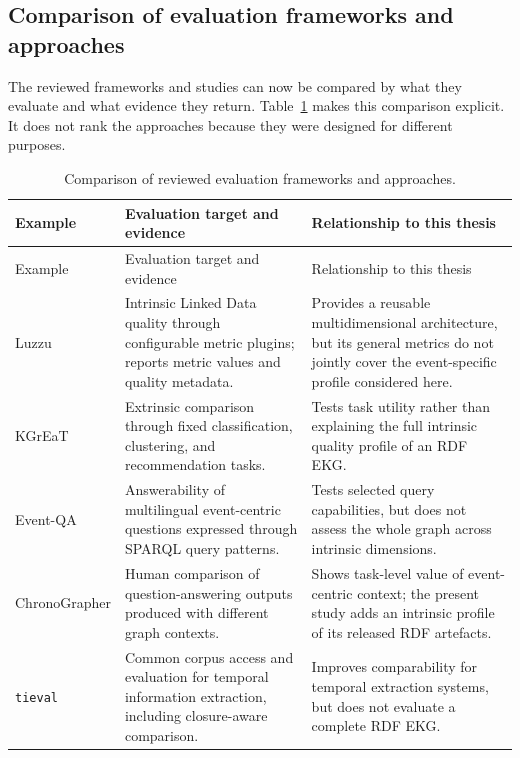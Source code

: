 \subsection{Comparison of evaluation frameworks and approaches}

The reviewed frameworks and studies can now be compared by what they evaluate and what evidence they return. Table~\ref{tab:reviewed-evaluation-comparison} makes this comparison explicit. It does not rank the approaches because they were designed for different purposes.

\begin{longtable}{>{\raggedright\arraybackslash}p{3.0cm}>{\raggedright\arraybackslash}p{5.3cm}>{\raggedright\arraybackslash}p{5.7cm}}
\caption{Comparison of reviewed evaluation frameworks and approaches.}\label{tab:reviewed-evaluation-comparison}\\
\toprule
Example & Evaluation target and evidence & Relationship to this thesis \\
\midrule
\endfirsthead
\toprule
Example & Evaluation target and evidence & Relationship to this thesis \\
\midrule
\endhead
Luzzu \citep{luzzu2016} & Intrinsic Linked Data quality through configurable metric plugins; reports metric values and quality metadata. & Provides a reusable multidimensional architecture, but its general metrics do not jointly cover the event-specific profile considered here. \\
KGrEaT \citep{kgreat2023} & Extrinsic comparison through fixed classification, clustering, and recommendation tasks. & Tests task utility rather than explaining the full intrinsic quality profile of an RDF EKG. \\
Event-QA \citep{eventqa2020} & Answerability of multilingual event-centric questions expressed through SPARQL query patterns. & Tests selected query capabilities, but does not assess the whole graph across intrinsic dimensions. \\
ChronoGrapher \citep{chronographer2023} & Human comparison of question-answering outputs produced with different graph contexts. & Shows task-level value of event-centric context; the present study adds an intrinsic profile of its released RDF artefacts. \\
\texttt{tieval} \citep{tieval2023} & Common corpus access and evaluation for temporal information extraction, including closure-aware comparison. & Improves comparability for temporal extraction systems, but does not evaluate a complete RDF EKG. \\

\end{longtable}
